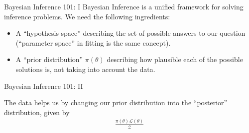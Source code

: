 \begin{frame}[t]{Bayesian Inference 101: I}
Bayesian Inference is a unified framework for solving inference problems.
We need the following ingredients:

\begin{itemize}
\item A ``hypothesis space'' describing the set of possible answers to our
question (``parameter space'' in fitting is the same concept).
\item A ``prior distribution'' $\pi\left(\theta\right)$ describing how plausible
each of the possible solutions is, not taking into account the data.
\end{itemize}

\end{frame}


\begin{frame}[t]{Bayesian Inference 101: II}

The data helps us by changing our prior distribution into the ``posterior''
distribution, given by
\begin{eqnarray}
\frac{\pi(\theta)\mathcal{L}(\theta)}{\mathcal{Z}}
\end{eqnarray}
\end{frame}




